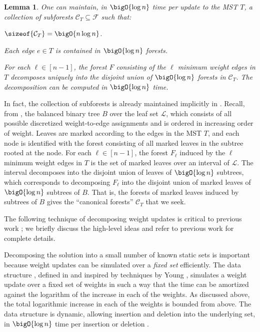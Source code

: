 \documentclass[11pt]{article}
\numberwithin{equation}{section}
\newtheorem{lemma}[theorem]{Lemma}
\theoremstyle{definition}
\theoremstyle{plain}
\newcommand{\forests}{\mathcal{F}} %
\newcommand{\leaves}{\mathcal{L}} %
\newcommand{\subforests}[1][T]{\mathcal{C}_{#1}} %
\begin{document}
\begin{lemma}
   One can maintain, in
  $\bigO{\log n}$ time per update to the MST $T$, a collection of
  subforests $\subforests \subseteq \forests$ such that:
  \begin{mathresults}
  \item $\sizeof{\subforests} = \bigO{n \log n}$.
  \item Each edge $e \in T$ is contained in $\bigO{\log n}$ forests.
  \item For each $\ell \in [n-1]$, the forest $F$ consisting of the
    $\ell$ minimum weight edges in $T$ decomposes uniquely into the
    disjoint union of $\bigO{\log n}$ forests in $\subforests$. The
    decomposition can be computed in $\bigO{\log n}$ time.
  \end{mathresults}
\end{lemma}

In fact, the collection of subforests is already maintained implicitly
in . Recall, from , the
balanced binary tree $B$ over the leaf set $\leaves$, which consists
of all possible discretized weight-to-edge assignments and is ordered
in increasing order of weight. Leaves are marked according to the
edges in the MST $T$, and each node is identified with the forest
consisting of all marked leaves in the subtree rooted at the node. For
each $\ell \in [n-1]$, the forest $F_{\ell}$ induced by the $\ell$
minimum weight edges in $T$ is the set of marked leaves over an
interval of $\leaves$. The interval decomposes into the disjoint union
of leaves of $\bigO{\log n}$ subtrees, which corresponds to
decomposing $F_{\ell}$ into the disjoint union of marked leaves of
$\bigO{\log n}$ subtrees of $B$. That is, the forests of marked leaves
induced by subtrees of $B$ gives the ``canonical forests''
$\subforests$ that we seek.

The following technique of decomposing weight updates is critical to
previous work \cite{cq-17-soda,cq-17-focs,cq-19}; we briefly
discuss the high-level ideas and refer to previous work for complete
details.

Decomposing the solution into a small number of known static sets is
important because weight updates can be simulated over a \emph{fixed
  set} efficiently. The data structure , defined in
\cite{cq-17-soda} and inspired by techniques by Young
\cite{young-14}, simulates a weight update over a fixed set of weights
in such a way that the time can be amortized against the logarithm of
the increase in each of the weights. As discussed above, the total
logarithmic increase in each of the weights is bounded from above. The
data structure  is dynamic, allowing insertion and
deletion into the underlying set, in $\bigO{\log n}$ time per
insertion or deletion \cite{cq-17-focs}.
\end{document}
